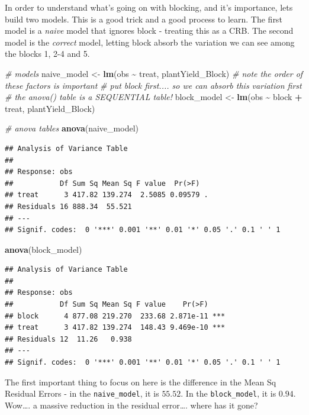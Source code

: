 \documentclass[
]{book}
\newenvironment{Shaded}{\begin{snugshade}}{\end{snugshade}}
\newcommand{\CommentTok}[1]{\textcolor[rgb]{0.56,0.35,0.01}{\textit{#1}}}
\newcommand{\FunctionTok}[1]{\textcolor[rgb]{0.13,0.29,0.53}{\textbf{#1}}}
\newcommand{\NormalTok}[1]{#1}
\newcommand{\OtherTok}[1]{\textcolor[rgb]{0.56,0.35,0.01}{#1}}
\newcommand{\SpecialCharTok}[1]{\textcolor[rgb]{0.81,0.36,0.00}{\textbf{#1}}}
\begin{document}
In order to understand what's going on with blocking, and it's importance, lets build two models. This is a good trick and a good process to learn. The first model is a \emph{naive} model that ignores block - treating this as a CRB. The second model is the \emph{correct} model, letting block absorb the variation we can see among the blocks 1, 2-4 and 5.

\begin{Shaded}
\begin{Highlighting}[]
\CommentTok{\# models}
\NormalTok{naive\_model }\OtherTok{\textless{}{-}} \FunctionTok{lm}\NormalTok{(obs }\SpecialCharTok{\textasciitilde{}}\NormalTok{ treat, plantYield\_Block)}
\CommentTok{\# note the order of these factors is important}
\CommentTok{\# put block first.... so we can absorb this variation first}
\CommentTok{\# the anova() table is a SEQUENTIAL table!}
\NormalTok{block\_model }\OtherTok{\textless{}{-}} \FunctionTok{lm}\NormalTok{(obs }\SpecialCharTok{\textasciitilde{}}\NormalTok{ block }\SpecialCharTok{+}\NormalTok{ treat, plantYield\_Block) }

\CommentTok{\# anova tables}
\FunctionTok{anova}\NormalTok{(naive\_model)}
\end{Highlighting}
\end{Shaded}

\begin{verbatim}
## Analysis of Variance Table
## 
## Response: obs
##           Df Sum Sq Mean Sq F value  Pr(>F)  
## treat      3 417.82 139.274  2.5085 0.09579 .
## Residuals 16 888.34  55.521                  
## ---
## Signif. codes:  0 '***' 0.001 '**' 0.01 '*' 0.05 '.' 0.1 ' ' 1
\end{verbatim}

\begin{Shaded}
\begin{Highlighting}[]
\FunctionTok{anova}\NormalTok{(block\_model)}
\end{Highlighting}
\end{Shaded}

\begin{verbatim}
## Analysis of Variance Table
## 
## Response: obs
##           Df Sum Sq Mean Sq F value    Pr(>F)    
## block      4 877.08 219.270  233.68 2.871e-11 ***
## treat      3 417.82 139.274  148.43 9.469e-10 ***
## Residuals 12  11.26   0.938                      
## ---
## Signif. codes:  0 '***' 0.001 '**' 0.01 '*' 0.05 '.' 0.1 ' ' 1
\end{verbatim}

The first important thing to focus on here is the difference in the Mean Sq Residual Errors - in the \texttt{naive\_model}, it is \(55.52\). In the \texttt{block\_model}, it is \(0.94\). Wow\ldots. a massive reduction in the residual error\ldots. where has it gone?
\end{document}
